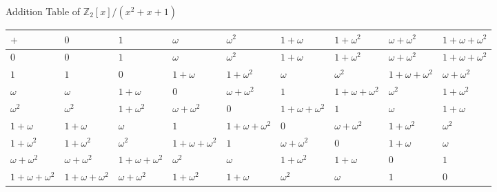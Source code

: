 \documentclass[ %
 10pt, xcolor={dvipsnames,svgnames,x11names,hyperref},
   hyperref={colorlinks=true,citecolor=green,linkcolor=DarkRed,urlcolor=ProcessBlue,anchorcolor=blue}
  ]{beamer}
\newcommand{\Z}{\mathbb{Z}}
\begin{document}
\begin{frame}{Addition Table of $\Z_2[x]/(x^2+x+1)$}

\begin{table}[]
\tiny{
\begin{tabular}{ p{8mm}|p{8mm}|p{8mm} |p{8mm}|p{8mm}|p{8mm}|p{8mm}|p{8mm}|p{8mm}}
$+$  & $0$ & $1$ & $\omega$ & $\omega^2$ & $1+\omega$ & $1+\omega^2$ & $\omega+\omega^2$ & $1+\omega+\omega^2$ \\
\hline
$0$ &$0$ & $1$ & $\omega$ & $\omega^2$ & $1+\omega$ & $1+\omega^2$ & $\omega+\omega^2$ & $1+\omega+\omega^2$   \\
\hline
$1$ & $1$ & $0$ & $1+\omega$ & $1+\omega^2$ & $\omega$ & $\omega^2$ & $1+\omega+\omega^2$ & $\omega+\omega^2$  \\
\hline
$\omega$ & $\omega$ & $1+\omega$ & $0$ & $\omega+\omega^2$  & $1$ & $1+\omega+\omega^2$ & $\omega^2$ & $1+\omega^2$\\
\hline
$\omega^2$ & $\omega^2$& $1+\omega^2$ & $\omega+\omega^2$&$0$ & $1+\omega+\omega^2$ &$1$& $\omega$ & $ 1+\omega$\\
\hline
$1+\omega$ & $1+\omega$& $\omega$ & $1$&$1+\omega+\omega^2$ & $0$ &$\omega+\omega^2$& $1+\omega^2$ & $\omega^2$\\
\hline
$1+\omega^2$ & $1+\omega^2$& $\omega^2$&$1+\omega+\omega^2$ & $1$&$\omega+\omega^2$ &$0$& $1+\omega$ & $\omega$\\
\hline
$\omega+\omega^2$ & $\omega+\omega^2$&$1+\omega+\omega^2$& $\omega^2$&$\omega$ & $1+\omega^2$&$1+\omega$ &$0$& $1$\\
\hline
$1+\omega+\omega^2$ & $1+\omega+\omega^2$&$\omega+\omega^2$& $1+\omega^2$&$1+\omega$ & $\omega^2$&$\omega$ &$1$& $0$\\

\end{tabular}
}
\end{table}
\end{frame}
\end{document}

